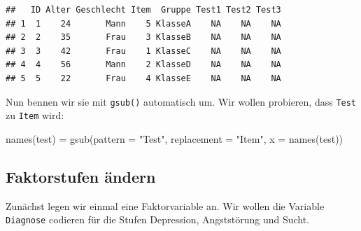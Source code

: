 \documentclass[
]{book}
\newenvironment{Shaded}{\begin{snugshade}}{\end{snugshade}}
\newcommand{\AttributeTok}[1]{\textcolor[rgb]{0.77,0.63,0.00}{#1}}
\newcommand{\ConstantTok}[1]{\textcolor[rgb]{0.00,0.00,0.00}{#1}}
\newcommand{\FunctionTok}[1]{\textcolor[rgb]{0.00,0.00,0.00}{#1}}
\newcommand{\NormalTok}[1]{#1}
\newcommand{\OtherTok}[1]{\textcolor[rgb]{0.56,0.35,0.01}{#1}}
\newcommand{\SpecialCharTok}[1]{\textcolor[rgb]{0.00,0.00,0.00}{#1}}
\newcommand{\StringTok}[1]{\textcolor[rgb]{0.31,0.60,0.02}{#1}}
\begin{document}
\begin{Shaded}
\end{Shaded}

\begin{verbatim}
##   ID Alter Geschlecht Item  Gruppe Test1 Test2 Test3
## 1  1    24       Mann    5 KlasseA    NA    NA    NA
## 2  2    35       Frau    3 KlasseB    NA    NA    NA
## 3  3    42       Frau    1 KlasseC    NA    NA    NA
## 4  4    56       Mann    2 KlasseD    NA    NA    NA
## 5  5    22       Frau    4 KlasseE    NA    NA    NA
\end{verbatim}

Nun bennen wir sie mit \texttt{gsub()} automatisch um. Wir wollen probieren, dass \texttt{Test} zu \texttt{Item} wird:

\begin{Shaded}
\begin{Highlighting}[]
\FunctionTok{names}\NormalTok{(test) }\OtherTok{=} \FunctionTok{gsub}\NormalTok{(}\AttributeTok{pattern =} \StringTok{"Test"}\NormalTok{, }\AttributeTok{replacement =} \StringTok{"Item"}\NormalTok{, }\AttributeTok{x =} \FunctionTok{names}\NormalTok{(test))}
\end{Highlighting}
\end{Shaded}

\hypertarget{faktorstufen-uxe4ndern}{%
\subsection{Faktorstufen ändern}\label{faktorstufen-uxe4ndern}}

Zunächst legen wir einmal eine Faktorvariable an. Wir wollen die Variable \texttt{Diagnose} codieren für die Stufen Depression, Angststörung und Sucht.

\begin{Shaded}
\end{Shaded}
\end{document}
